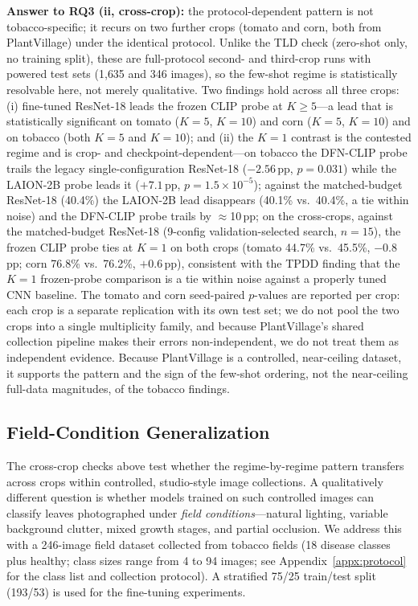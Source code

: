 \documentclass[10pt,a4paper]{article}
\begin{document}
\textbf{Answer to RQ3 (ii, cross-crop):} the protocol-dependent pattern is not tobacco-specific; it recurs on two further crops (tomato and corn, both from PlantVillage) under the identical protocol. Unlike the TLD check (zero-shot only, no training split), these are full-protocol second- and third-crop runs with powered test sets (1{,}635 and 346 images), so the few-shot regime is statistically resolvable here, not merely qualitative. Two findings hold across all three crops: (i) fine-tuned ResNet-18 leads the frozen CLIP probe at $K{\geq}5$---a lead that is statistically significant on tomato ($K{=}5$, $K{=}10$) and corn ($K{=}5$, $K{=}10$) and on tobacco (both $K{=}5$ and $K{=}10$); and (ii) the $K{=}1$ contrast is the contested regime and is crop- and checkpoint-dependent---on tobacco the DFN-CLIP probe trails the legacy single-configuration ResNet-18 ($-2.56$\,pp, $p{=}0.031$) while the LAION-2B probe leads it ($+7.1$\,pp, $p{=}1.5\times10^{-5}$); against the matched-budget ResNet-18 (40.4\%) the LAION-2B lead disappears (40.1\% vs.\ 40.4\%, a tie within noise) and the DFN-CLIP probe trails by $\approx$10\,pp; on the cross-crops, against the matched-budget ResNet-18 (9-config validation-selected search, $n{=}15$), the frozen CLIP probe ties at $K{=}1$ on both crops (tomato 44.7\% vs.\ 45.5\%, $-0.8$\,pp; corn 76.8\% vs.\ 76.2\%, $+0.6$\,pp), consistent with the TPDD finding that the $K{=}1$ frozen-probe comparison is a tie within noise against a properly tuned CNN baseline. The tomato and corn seed-paired $p$-values are reported per crop: each crop is a separate replication with its own test set; we do not pool the two crops into a single multiplicity family, and because PlantVillage's shared collection pipeline makes their errors non-independent, we do not treat them as independent evidence. Because PlantVillage is a controlled, near-ceiling dataset, it supports the pattern and the sign of the few-shot ordering, not the near-ceiling full-data magnitudes, of the tobacco findings.

\subsection{Field-Condition Generalization}
\label{sec:field}

The cross-crop checks above test whether the regime-by-regime pattern transfers across crops within controlled, studio-style image collections. A qualitatively different question is whether models trained on such controlled images can classify leaves photographed under \emph{field conditions}---natural lighting, variable background clutter, mixed growth stages, and partial occlusion. We address this with a 246-image field dataset collected from tobacco fields (18 disease classes plus healthy; class sizes range from 4 to 94 images; see Appendix~\ref{appx:protocol} for the class list and collection protocol). A stratified 75/25 train/test split (193/53) is used for the fine-tuning experiments.
\end{document}
